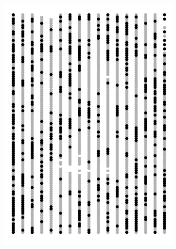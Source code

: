 \documentclass{uwstat572}
\begin{document}
\begin{figure}[H]
\begin{subfigure}[b]{0.24\textwidth}
		\includegraphics[width=\textwidth]{figures/figure_5b.png}
		\caption{}
		\label{fig:week_40}
	\end{subfigure}
	\hfill
	\begin{subfigure}[b]{0.24\textwidth}

\end{subfigure}
\end{figure}
\end{document}
